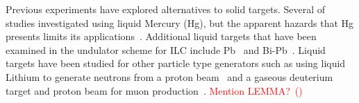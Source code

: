 \documentclass[
reprint,
nofootinbib,
amsmath, amssymb,
aps,
floatfix,
]{revtex4-2}
\begin{document}

Previous experiments have explored alternatives to solid targets.
Several of studies investigated using liquid Mercury (Hg), but the apparent hazards that Hg presents limits its applications~\cite{Mikhailichenko2006}.
Additional liquid targets that have been examined in the undulator scheme for ILC include Pb~\cite{Sheppard2002} and Bi-Pb~\cite{Mikhailichenko2006}.
Liquid targets have been studied for other particle type generators such as
using liquid Lithium to generate neutrons from a proton beam~\cite{Feinberg2011} and a gaseous deuterium
target and proton beam for muon production~\cite{Okita2020}.  \textcolor{red}{Mention LEMMA?~(\cite{Alesini2019})}


\end{document}
